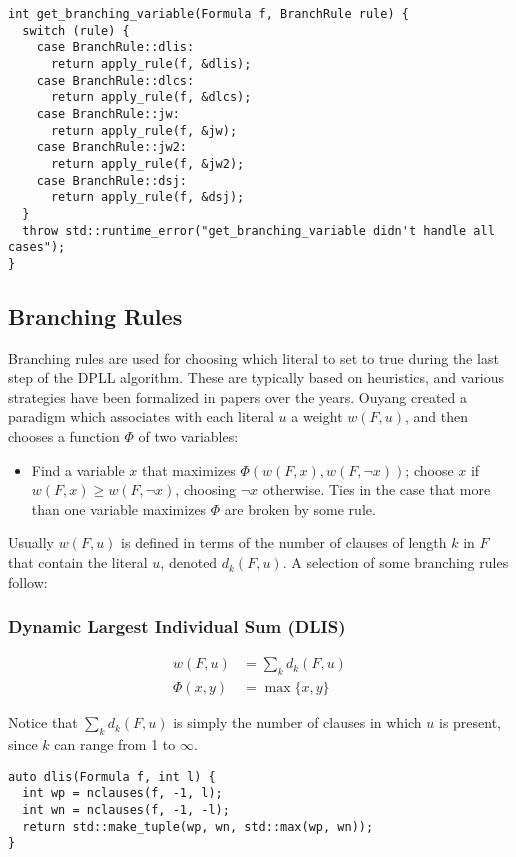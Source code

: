 \documentclass[10pt,AMS Euler]{article}
\begin{document}
\begin{verbatim}
int get_branching_variable(Formula f, BranchRule rule) {
  switch (rule) {
    case BranchRule::dlis:
      return apply_rule(f, &dlis);
    case BranchRule::dlcs:
      return apply_rule(f, &dlcs);
    case BranchRule::jw:
      return apply_rule(f, &jw);
    case BranchRule::jw2:
      return apply_rule(f, &jw2);
    case BranchRule::dsj:
      return apply_rule(f, &dsj);
  }
  throw std::runtime_error("get_branching_variable didn't handle all cases");
}
\end{verbatim}

\subsection*{Branching Rules}
\label{sec:orge202a3a}
Branching rules are used for choosing which literal to set to true during
the last step of the DPLL algorithm. These are typically based on heuristics,
and various strategies have been formalized in papers over the years.
Ouyang \cite{ouyang} created a paradigm which associates with each literal \(u\) a weight \(w(F, u)\),
and then chooses a function \(\Phi\) of two variables:
\begin{itemize}
\item Find a variable \(x\) that maximizes \(\Phi(w(F,x), w(F, \neg x))\); choose \(x\) if
\(w(F, x) \geq w(F,\neg x)\), choosing \(\neg x\) otherwise. Ties in the case that more
than one variable maximizes \(\Phi\) are broken by some rule.
\end{itemize}

Usually \(w(F,u)\) is defined in terms of the number of clauses of length \(k\) in \(F\) that contain the
literal \(u\), denoted \(d_k(F, u)\). A selection of some branching rules follow:
\subsubsection*{Dynamic Largest Individual Sum (DLIS)}
\label{sec:orgcf21bdf}
\begin{align*}
w(F,u) &= \sum_k d_k(F,u) \\
\Phi(x,y) &= \max\{x,y\}
\end{align*}

Notice that \(\sum_k d_k(F,u)\) is simply the number of clauses in which \(u\) is present,
since \(k\) can range from 1 to \(\infty\).
\begin{verbatim}
auto dlis(Formula f, int l) {
  int wp = nclauses(f, -1, l);
  int wn = nclauses(f, -1, -l);
  return std::make_tuple(wp, wn, std::max(wp, wn));
}
\end{verbatim}
\end{document}
